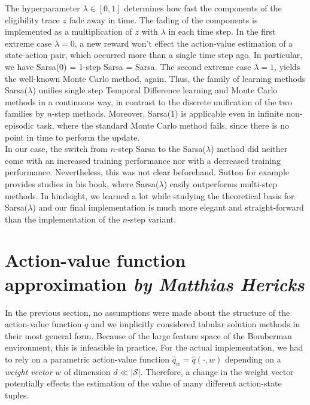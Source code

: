 The hyperparameter $\lambda \in [0, 1]$ determines how fast the components of the eligibility trace $z$ fade away in time. The fading of the components is implemented as a multiplication of $z$ with $\lambda$ in each time step. In the first extreme case $\lambda = 0$, a new reward won't effect the action-value estimation of a state-action pair, which occurred more than a single time step ago. In particular, we have Sarsa(0) = 1-step Sarsa = Sarsa. The second extreme case $\lambda = 1$, yields the well-known Monte Carlo method, again. Thus, the family of learning methods Sarsa($\lambda$) unifies single step Temporal Difference learning and Monte Carlo methods in a continuous way, in contrast to the discrete unification of the two families by $n$-step methods. Moreover, Sarsa(1) is applicable even in infinite non-episodic task, where the standard Monte Carlo method fails, since there is no point in time to perform the update. \\

In our case, the switch from $n$-step Sarsa to the Sarsa($\lambda$) method did neither come with an increased training performance nor with a decreased training performance. Nevertheless, this was not clear beforehand. Sutton for example provides studies in his book, where Sarsa($\lambda$) easily outperforms multi-step methods. In hindsight, we learned a lot while studying the theoretical basis for Sarsa($\lambda$) and our final implementation is much more elegant and straight-forward than the implementation of the $n$-step variant. \\

\section[Action-value function approximation]{Action-value function approximation \hfill \small \normalfont\textit{by Matthias Hericks}}

In the previous section, no assumptions were made about the structure of the action-value function $q$ and we implicitly considered tabular solution methods in their most general form. Because of the large feature space of the Bomberman environment, this is infeasible in practice. For the actual implementation, we had to rely on a parametric action-value function $\hat q_{w} = \hat q(\cdot, w)$ depending on a \emph{weight vector} $w$ of dimension $d \ll |\mathcal{S}|$. Therefore, a change in the weight vector potentially effects the estimation of the value of many different action-state tuples. \\

